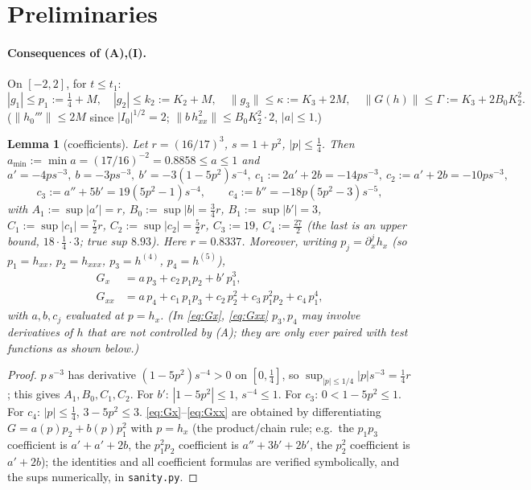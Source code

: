 \documentclass[11pt]{article}
\newtheorem{lemma}[theorem]{Lemma}
\theoremstyle{remark}\newtheorem{remark}[theorem]{Remark}
\newcommand{\nrm}[1]{\lVert #1\rVert}
\begin{document}
\section{Preliminaries}
\paragraph{Consequences of (A),(I).} On $[-2,2]$, for $t\le t_1$:
\begin{equation}\label{eq:P}
|g_1|\le p_1:=\tfrac14+M,\quad |g_2|\le k_2:=K_2+M,\quad \nrm{g_3}\le\kappa:=K_3+2M,\quad \nrm{G(h)}\le \Gamma:=K_3+2B_0K_2^2 .
\end{equation}
($\nrm{h_0'''}\le 2M$ since $|I_0|^{1/2}=2$; $\nrm{b\,h_{xx}^2}\le B_0K_2^2\cdot2$, $|a|\le1$.)

\begin{lemma}[coefficients]\label{lem:coef}
Let $r=(16/17)^3$, $s=1+p^2$, $|p|\le\frac14$. Then $a_{\min}:=\min a=(17/16)^{-2}=0.8858\le a\le1$ and
\[
a'=-4ps^{-3},\ b=-3ps^{-3},\ b'=-3(1-5p^2)s^{-4},\ c_1:=2a'+2b=-14ps^{-3},\ c_2:=a'+2b=-10ps^{-3},
\]
\[ c_3:=a''+5b'=19(5p^2-1)s^{-4},\qquad c_4:=b''=-18p(5p^2-3)s^{-5},
\]
with $A_1:=\sup|a'|=r$, $B_0:=\sup|b|=\frac34r$, $B_1:=\sup|b'|=3$, $C_1:=\sup|c_1|=\frac72r$, $C_2:=\sup|c_2|=\frac52r$, $C_3:=19$, $C_4:=\frac{27}{2}$ (the last is an upper bound, $18\cdot\frac14\cdot3$; true sup $8.93$). Here $r=0.8337$.
Moreover, writing $p_j=\partial_x^{j}h_x$ (so $p_1=h_{xx}$, $p_2=h_{xxx}$, $p_3=h^{(4)}$, $p_4=h^{(5)}$), 
\begin{align}
G_x&=a\,p_3+c_2\,p_1p_2+b'\,p_1^3,\label{eq:Gx}\\
G_{xx}&=a\,p_4+c_1\,p_1p_3+c_2\,p_2^2+c_3\,p_1^2p_2+c_4\,p_1^4 ,\label{eq:Gxx}
\end{align}
with $a,b,c_j$ evaluated at $p=h_x$. (In \eqref{eq:Gx}, \eqref{eq:Gxx} $p_3,p_4$ may involve derivatives of $h$ that are not controlled by (A); they are only ever paired with test functions as shown below.)
\end{lemma}
\begin{proof}
$p\,s^{-3}$ has derivative $(1-5p^2)s^{-4}>0$ on $[0,\frac14]$, so $\sup_{|p|\le1/4}|p|s^{-3}=\frac14r$; this gives $A_1,B_0,C_1,C_2$. For $b'$: $|1-5p^2|\le1$, $s^{-4}\le1$. For $c_3$: $0<1-5p^2\le1$. For $c_4$: $|p|\le\frac14$, $3-5p^2\le3$. \eqref{eq:Gx}--\eqref{eq:Gxx} are obtained by differentiating $G=a(p)p_2+b(p)p_1^2$ with $p=h_x$ (the product/chain rule; e.g.\ the $p_1p_3$ coefficient is $a'+a'+2b$, the $p_1^2p_2$ coefficient is $a''+3b'+2b'$, the $p_2^2$ coefficient is $a'+2b$); the identities and all coefficient formulas are verified symbolically, and the sups numerically, in \texttt{sanity.py}.
\end{proof}
\end{document}
